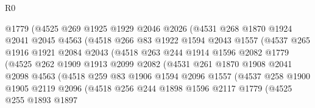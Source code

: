 \begin{lexlean}{R0}
\begin{coremodule}
                    @1779
                    (@4525
                      @269
                      @1925
                      @1929
                      @2046
                      @2026
                      (@4531
                        @268
                        @1870
                        @1924
                        @2041
                        @2045
                        @4563
                        (@4518
                          @266
                          @83
                          @1922
                          @1594
                          @2043
                          @1557
                          (@4537
                            @265
                            @1916
                            @1921
                            @2084
                            @2043
                            (@4518
                              @263
                              @244
                              @1914
                              @1596
                              @2082
                              @1779
                              (@4525
                                @262
                                @1909
                                @1913
                                @2099
                                @2082
                                (@4531
                                  @261
                                  @1870
                                  @1908
                                  @2041
                                  @2098
                                  @4563
                                  (@4518
                                    @259
                                    @83
                                    @1906
                                    @1594
                                    @2096
                                    @1557
                                    (@4537
                                      @258
                                      @1900
                                      @1905
                                      @2119
                                      @2096
                                      (@4518
                                        @256
                                        @244
                                        @1898
                                        @1596
                                        @2117
                                        @1779
                                        (@4525
                                          @255
                                          @1893
                                          @1897

\end{coremodule}
\end{lexlean}
